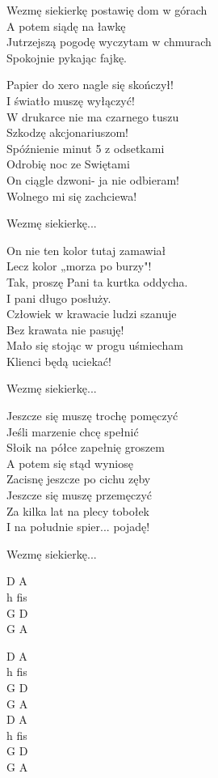 \begin{text}

    \vin Wezmę siekierkę postawię dom w górach\\
    \vin A potem siądę na ławkę\\
    \vin Jutrzejszą pogodę wyczytam w chmurach\\
    \vin Spokojnie pykając fajkę.

    Papier do xero nagle się skończył! \\
    I światło muszę wyłączyć!\\
    W drukarce nie ma czarnego tuszu\\
    Szkodzę akcjonariuszom!\\
    Spóźnienie minut 5 z odsetkami\\
    Odrobię noc ze Swiętami\\
    On ciągle dzwoni- ja nie odbieram!\\
    Wolnego mi się zachciewa!

    \vin Wezmę siekierkę...

    On nie ten kolor tutaj zamawiał\\
    Lecz kolor „morza po burzy"!\\
    Tak, proszę Pani ta kurtka oddycha.\\
    I pani długo posłuży.\\
    Człowiek w krawacie ludzi szanuje\\
    Bez krawata nie pasuję!\\
    Mało się stojąc w progu uśmiecham\\
    Klienci będą uciekać!

    \vin Wezmę siekierkę...

    Jeszcze się muszę trochę pomęczyć\\
    Jeśli marzenie chcę spełnić\\
    Słoik na półce zapełnię groszem\\
    A potem się stąd wyniosę\\
    Zacisnę jeszcze po cichu zęby\\
    Jeszcze się muszę przemęczyć\\
    Za kilka lat na plecy tobołek\\
    I na południe spier... pojadę!
	
	\vin Wezmę siekierkę...

\end{text}
\begin{chord}
    D A\\
    h fis\\
    G D\\
	G A

    D A\\
	h fis\\
	G D\\
    G A\\
    D A\\
    h fis\\
    G D\\
    G A

\end{chord}